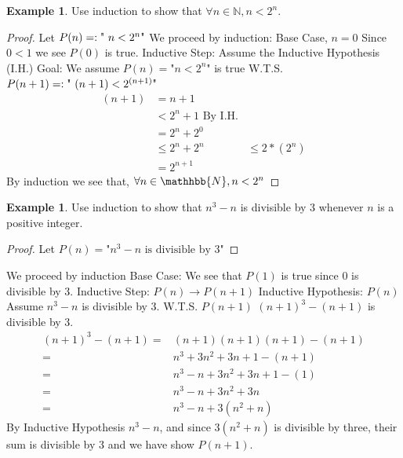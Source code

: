 \documentclass[letterpaper,10pt]{article}
\theoremstyle{plain}
\theoremstyle{definition}
\newtheorem{exmp}[thm]{Example}
\theoremstyle{remark}
\begin{document}
\begin{exmp}
Use induction to show that $\forall n\in \mathbb{N}, n< 2^n$.
\begin{proof}
Let $P(n)=:\text{" $ n< 2^n$"}$
\newline
We proceed by induction:
\newline
Base Case, $n=0$
\newline
Since $0<1$ we see $P(0)$ is true. 
\newline
Inductive Step:
\newline
Assume the Inductive Hypothesis (I.H.)
\newline
Goal:
\newline
We assume $P(n)=\text{"$n<2^n$"}$ is true
\newline
W.T.S. $P(n+1)=:\text{" $ (n+1)< 2^{(n+1)}$"}$
\newline
\begin{align}
(n+1)&=n+1\\
    &<2^n+1 \text{ By I.H.}\\
    &=2^n+2^0\\
    &\leq 2^n+2^n
    &\leq 2*(2^n)\\
    &=2^{n+1}
\end{align}
By induction we see that,
$\forall n \in \mathhbb{N}, n<2^n$

\end{proof}

\end{exmp}
\begin{exmp}
Use induction to show that $n^3-n$ is divisible by 3 whenever $n$ is a positive integer. 
\begin{proof}
Let $P(n)=\text{"$n^3-n$ is divisible by 3"}$
\newline

\end{proof}
We proceed by induction
\newline
Base Case:
\newline
We see that $P(1)$ is true since 0 is divisible by 3.
\newline
Inductive Step: $P(n)\to P(n+1)$
\newline
Inductive Hypothesis: $P(n)$
\newline
Assume $n^3-n$ is divisible by 3.
\newline
W.T.S. $P(n+1)$
\newline
$(n+1)^3-(n+1)$ is divisible by 3.
\newline
\begin{align}
(n+1)^3-(n+1)=&(n+1)(n+1)(n+1)-(n+1)\\
=&n^3+3n^2+3n+1-(n+1)\\
=&n^3-n +3n^2+3n+1-(1)\\
=&n^3-n +3n^2+3n\\
=&n^3-n +3(n^2+n)
\end{align}
By Inductive Hypothesis $n^3-n$, and since $3(n^2+n)$ is divisible by three, their sum is divisible by 3 and we have show $P(n+1)$.
\end{exmp}
\end{document}
